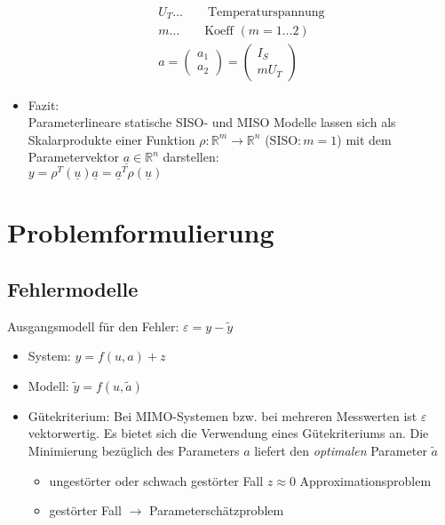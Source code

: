\documentclass[ngerman]{tudscrreprt}
\begin{document}
\begin{itemize}
\begin{align*}
	U_T \dots \qquad \text{Temperaturspannung}\\ 
	m \dots \qquad \text{Koeff } (m = 1 \dots 2)\\ 
	a = \begin{pmatrix} a_1\\ a_2 \end{pmatrix} = \begin{pmatrix} I_S \\ mU_T\end{pmatrix}
	\end{align*}
	\item Fazit:\\Parameterlineare statische SISO- und MISO Modelle lassen sich als Skalarprodukte einer Funktion $\rho: \mathbb{R}^m \rightarrow \mathbb{R}^n $ (SISO$:m=1$) mit dem Parametervektor $\underline{a} \in \mathbb{R}^n$ darstellen:\\$y=\rho^T(\underline{u})\underline{a} = \underline{a}^T \rho(\underline{u})$
	\end{itemize}
	\section{Problemformulierung}
		\subsection{Fehlermodelle}
		Ausgangsmodell für den Fehler: $\varepsilon = y - \tilde{y}$ 
		\begin{itemize}
		\item System: $y = f(u,a) + z$
		\item Modell: $\tilde{y} = f(u,\tilde{a})$
		\item Gütekriterium: Bei MIMO-Systemen bzw. bei mehreren Messwerten ist $\varepsilon$ vektorwertig. Es bietet sich die Verwendung eines Gütekriteriums an. Die Minimierung bezüglich des Parameters $a$ liefert den \textit{optimalen} Parameter $\tilde{a}$

		\begin{itemize}
		\item ungestörter oder schwach gestörter Fall $z\approx0$ Approximationsproblem
		\item gestörter Fall $\rightarrow$ Parameterschätzproblem
		\end{itemize}
		\end{itemize}
\end{document}
